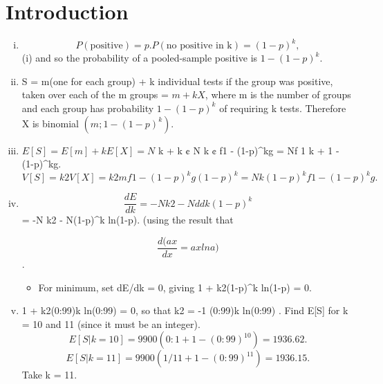 \documentclass[a4paper,12pt]{article}
\begin{document}
\section{Introduction}
\begin{enumerate}[(i)]
\item \[P(\mbox{positive})= p. P(\mbox{no positive in k})= (1-p)^k,\]
(i) and so the probability of a pooled-sample positive is $1 - (1-p)^k$.
\item S = m(one for each group) + k individual tests if the group was positive,
taken over each of the m groups = $m+kX$, where m is the number of groups
and each group has probability $1 - (1-p)^k$ of requiring k tests.
Therefore X is binomial $(m; 1 - (1-p)^k)$.

\item $E[S] = E[m] + kE[X] = N$
k + k ¢ N
k ¢ f1 - (1-p)^kg = Nf 1
k + 1 - (1-p)^kg.
\[V [S] = k2V [X] = k2mf1 - (1-p)^kg(1-p)^k = Nk(1-p)^kf1 - (1-p)^kg.\]
\item 
\[ \frac{dE}{dk}
 = -N
k2 - N d
dk (1-p)^k \]= -N
k2 - N(1-p)^k ln(1-p).
(using the result that

\[ \frac{d(ax}{dx} = ax ln a)\].
\begin{itemize}
\item For minimum, set dE/dk = 0, giving 1 + k2(1-p)^k ln(1-p) = 0.
\end{itemize}
\item 1 + k2(0:99)k ln(0:99) = 0, so that k2 = -1
(0:99)k ln(0:99) .
Find E[S] for k = 10 and 11 (since it must be an integer).
\[E[S|k = 10] = 9900(0:1 + 1 - (0:99)^{10}) = 1936.62.\]
\[E[S|k = 11] = 9900( 1/11 + 1 - (0:99)^{11}) = 1936.15.\]
Take k = 11.
\end{enumerate}
\end{document}
